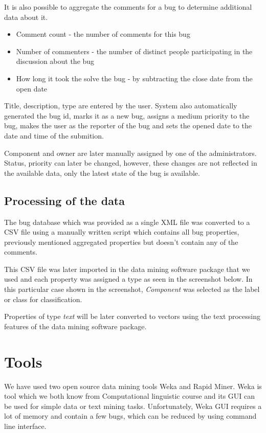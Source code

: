It is also possible to aggregate the comments for a bug to determine additional data about it.

\begin{itemize}
\item Comment count - the number of comments for this bug
\item Number of commenters - the number of distinct people participating in the discussion about the bug
\item How long it took the solve the bug - by subtracting the close date from the open date
\end{itemize}

Title, description, type are entered by the user. System also automatically generated the bug id, marks it as a new bug, assigns a medium priority to the bug, makes the user as the reporter of the bug and sets the opened date to the date and time of the submition.

Component and owner are later manually assigned by one of the administrators. Status, priority can later be changed, however, these changes are not reflected in the available data, only the latest state of the bug is available.

\subsection*{Processing of the data} %

The bug database which was provided as a single XML file was converted to a CSV file using a manually written script which contains all bug properties, previously mentioned aggregated properties but doesn't contain any of the comments.

This CSV file was later imported in the data mining software package that we used and each property was assigned a type as seen in the screenshot below. In this particular case shown in the screenshot, {\it Component} was selected as the label or class for classification.


Properties of type {\it text} will be later converted to vectors using the text processing features of the data mining software package.



\section{Tools} %
\label{sub:Tools}
We have used two open source data mining tools Weka and Rapid Miner.
Weka is tool which we both know from Computational linguistic course and its GUI can be used
for simple data or text mining tasks. Unfortunately, Weka GUI requires a lot of memory and contain a few bugs, 
which can be reduced by using command line interface.


